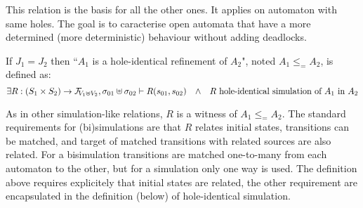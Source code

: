 \documentclass{article}
\begin{document}
This relation is the basis for all the other ones.
It applies on automaton with same holes.
The goal is to caracterise open automata that have a more determined (more deterministic) behaviour without adding deadlocks.
\begin{defi} %
If \(J_1 = J_2\) then ``\(A_1\) is a hole-identical refinement of \(A_2\)", noted \(A_1 \leq_= A_2\), is defined as:
\[ \exists R: \mpar{S_1 \times S_2} \to \rformulae[V_1 \uplus V_2], \sigma_{01} \uplus \sigma_{02} \vdash R\mpar{s_{01}, s_{02}} \qwedge R \text{ hole-identical simulation of } A_1 \text{ in } A_2 \]
\end{defi}
As in other simulation-like relations, \(R\) is a witness of \(A_1 \leq_= A_2\).
The standard requirements for (bi)simulations are that \(R\) relates initial states, transitions can be matched, and target of matched transitions with related sources are also related.
For a bisimulation transitions are matched one-to-many from each automaton to the other, but for a simulation only one way is used.
The definition above requires explicitely that initial states are related, the other requirement are encapsulated in the definition (below) of hole-identical simulation.
\end{document}
